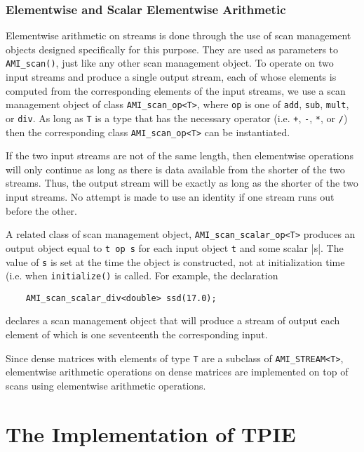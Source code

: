 
\subsection{Elementwise and Scalar Elementwise Arithmetic}
\label{sec:ref-ami-arith}


Elementwise arithmetic on streams is done through the use of scan
management objects designed specifically for this purpose.  They are
used as parameters to \verb|AMI_scan()|, just like any other scan
management object.  To operate on two input streams and produce a
single output stream, each of whose elements is computed from the
corresponding elements of the input streams, we use a scan management
object of class \verb|AMI_scan_op<T>|, where \verb|op| is one of
\verb|add|, \verb|sub|, \verb|mult|, or \verb|div|.  As long as
\verb|T| is a type that has the necessary operator (i.e. \verb|+|,
\verb|-|, \verb|*|, or \verb|/|) then the corresponding class
\verb|AMI_scan_op<T>| can be instantiated.

If the two input streams are not of the same length, then elementwise
operations will only continue as long as there is data available from
the shorter of the two streams.  Thus, the output stream will be
exactly as long as the shorter of the two input streams.  No attempt
is made to use an identity if one stream runs out before the other.

A related class of scan management object,
\verb|AMI_scan_scalar_op<T>| produces an output object equal to
\verb|t op s| for each input object \verb|t| and some scalar |s|.
The value of \verb|s| is set at the time the object is constructed,
not at initialization time (i.e. when \verb|initialize()| is called.
For example, the declaration
\begin{verbatim}
    AMI_scan_scalar_div<double> ssd(17.0);
\end{verbatim}
declares a scan management object that will produce a stream of output
each element of which is one seventeenth the corresponding input.

Since dense matrices with elements of type \verb|T| are a subclass of
\verb|AMI_STREAM<T>|, elementwise arithmetic operations on dense
matrices are implemented on top of scans using elementwise arithmetic
operations.



\chapter{The Implementation of TPIE}

